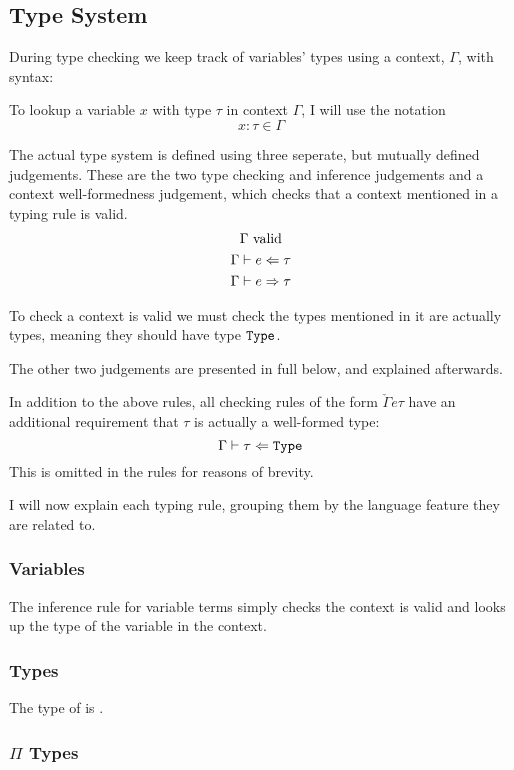 \documentclass[12pt,a4paper,twoside]{report}
\begin{document}
\subsection{Type System}

During type checking we keep track of variables' types using a context, \(\Gamma\), with syntax:
\ctxsyntax{}

To lookup a variable \(x\) with type \(\tau\) in context \(\Gamma\), I will use the notation
\[
    x : \tau \in \Gamma
\]

The actual type system is defined using three seperate, but mutually defined judgements.
These are the two type checking and inference judgements and a context well-formedness judgement, which checks that a context mentioned in a typing rule is valid.
\begin{gather*}
    \Gamma\ \text{valid} \\
    \Gamma \vdash e \Leftarrow \tau \\
    \Gamma \vdash e \Rightarrow \tau
\end{gather*}

To check a context is valid we must check the types mentioned in it are actually types, meaning they should have type \(\mathtt{Type}\).
\ctxvalidity

The other two judgements are presented in full below, and explained afterwards.

In addition to the above rules, all checking rules of the form \(\check{\Gamma}{e}{\tau}\) have an additional requirement that \(\tau\) is actually a well-formed type:
\[
    \Gamma \vdash \tau \Leftarrow \mathtt{Type}
\]
This is omitted in the rules for reasons of brevity.

I will now explain each typing rule, grouping them by the language feature they are related to.

\subsubsection{Variables}

The inference rule for variable terms simply checks the context is valid and looks up the type of the variable in the context.

\subsubsection{Types}

The type of \type{} is \type{}.

\subsubsection{\(\Pi\) Types}
\end{document}
